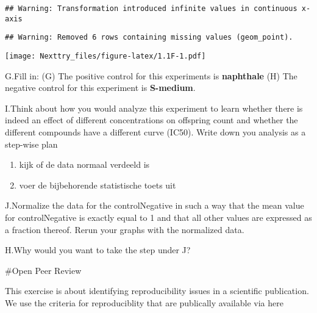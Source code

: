 \documentclass[
]{book}
\providecommand{\tightlist}{%
  \setlength{\itemsep}{0pt}\setlength{\parskip}{0pt}}
\begin{document}
\begin{verbatim}
## Warning: Transformation introduced infinite values in continuous x-axis
\end{verbatim}

\begin{verbatim}
## Warning: Removed 6 rows containing missing values (geom_point).
\end{verbatim}

\texttt{[image: Nexttry\_files/figure-latex/1.1F-1.pdf]}

G.Fill in: (G) The positive control for this experiments is \textbf{naphthale} (H) The negative control for this experiment is \textbf{S-medium}.

I.Think about how you would analyze this experiment to learn whether there is indeed an effect of different concentrations on offspring count and whether the different compounds have a different curve (IC50). Write down you analysis as a step-wise plan

\begin{enumerate}
\def\labelenumi{\arabic{enumi}.}
\tightlist
\item
  kijk of de data normaal verdeeld is
\item
  voer de bijbehorende statistische toets uit
\end{enumerate}

J.Normalize the data for the controlNegative in such a way that the mean value for controlNegative is exactly equal to 1 and that all other values are expressed as a fraction thereof. Rerun your graphs with the normalized data.

H.Why would you want to take the step under J?

\#Open Peer Review

This exercise is about identifying reproducibility issues in a scientific publication. We use the criteria for reproduciblity that are publically available via here
\end{document}
